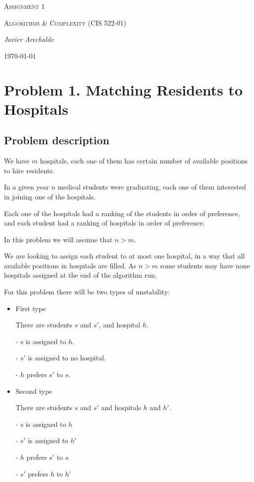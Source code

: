 \documentclass{article}
\begin{document}
\begin{titlepage}
	\centering
	{\scshape\LARGE Assignment 1\par}
	\vspace{1cm}
	{\scshape\Large Algorithms \& Complexity (CIS 522-01)\par}
	\vspace{1.5cm}
	{\Large\itshape Javier Arechalde\par}
	\vfill
	{\large \today\par}
\end{titlepage}

\section*{Problem 1. Matching Residents to Hospitals}

\subsection*{Problem description}

We have $m$ hospitals, each one of them has certain number of available positions to hire residents.

In a given year $n$ medical students were graduating, each one of them interested in joining one of the hospitals.

Each one of the hospitals had a ranking of the students in order of preference, and each student had a ranking of hospitals in order of preference.

In this problem we will assume that $n>m$.

We are looking to assign each student to at most one hospital, in a way that all available positions in hospitals are filled. As $n>m$ some students may have none hospitals assigned at the end of the algorithm run.

For this problem there will be two types of unstability:

\begin{itemize}

\item{First type}

There are students $s$ and $s'$, and hospital $h$.

- $s$ is assigned to $h$.

- $s'$ is assigned to no hospital.

- $h$ prefers $s'$ to $s$.

\item{Second type}

There are students $s$ and $s'$ and hospitals $h$ and $h'$.

- $s$ is assigned to $h$

- $s'$ is assigned to $h'$

- $h$ prefers $s'$ to $s$

- $s'$ prefers $h$ to $h'$

\end{itemize}
\end{document}
